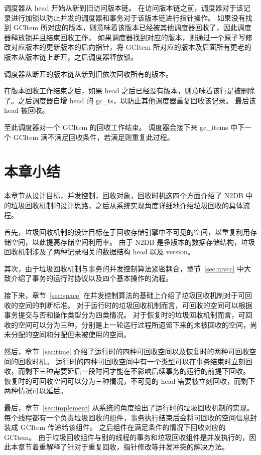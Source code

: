调度器从 head 开始从新到旧访问版本链。
在访问版本链之前，调度器对于该记录进行加锁以防止并发的调度器和事务对于该版本链进行指针操作。
如果没有找到 GCItem 所对应的版本，则意味着该版本已经被其他调度器回收了，因此调度器释放锁并且结束回收工作。
如果调度器找到对应的版本，则通过一个原子写修改对应版本的更新版本的后向指针，将 GCItem 所对应的版本及后面所有更老的版本从版本链上断开，之后调度器释放锁。

调度器从断开的版本链从新到旧依次回收所有的版本。

在版本回收工作结束之后，如果 head 之后已经没有版本，则意味着该行是被删除了。之后调度器自增 head 的 gc\_ts，以防止其他调度器重复回收该记录。
最后该 head 被回收。

至此调度器对一个 GCItem 的回收工作结束。
调度器会接下来 gc\_items 中下一个 GCItem 满不满足回收条件，若满足则重复此过程。


\section{本章小结}

本章节从设计目标，并发控制，回收对象，回收时机这四个方面介绍了 N2DB 中的垃圾回收机制的设计思路，之后从系统实现角度详细地介绍垃圾回收的具体流程。

首先，垃圾回收机制的设计目标在于回收存储引擎中不可见的空间，以重复利用存储空间，以此提高存储空间利用率。
由于 N2DB 是多版本的数据存储结构，垃圾回收机制涉及了两种记录相关的数据结构 head 以及 version。

其次，由于垃圾回收机制与事务的并发控制算法紧密耦合，章节~\ref{sec:mvcc} 中大致介绍了事务的运行时协议以及四个基本操作的流程。

接下来，章节~\ref{sec:space} 在并发控制算法的基础上介绍了垃圾回收机制对于可回收的空间的判断标准。
对于运行时的垃圾回收机制而言，可回收的空间可以根据事务提交与否和操作类型分为四类情况。
对于恢复时的垃圾回收机制而言，可回收的空间可以分为三种，分别是上一轮运行过程所遗留下来的未被回收的空间，尚未分配的空间和分配但未被使用的空间。

然后，章节~\ref{sec:time} 介绍了运行时的四种可回收空间以及恢复时的两种可回收空间的回收时机。
运行时的四种可回收空间中有一个类型可以在事务结束时立刻回收，而剩下三种需要延后一段时间才能在不影响后续事务的运行的前提下回收。
恢复时的可回收空间可以分为三种情况，不可见的 head 需要被立刻回收，而剩下两种情况可以延后。

最后，章节~\ref{sec:implement} 从系统的角度给出了运行时的垃圾回收机制的实现。每个线程都有一个负责垃圾回收的组件，事务执行结束后会将可回收的空间信息封装成 GCItem 传递给该组件。
之后组件在满足条件的情况下回收对应的 GCItem。
由于垃圾回收组件与别的线程的事务和垃圾回收组件是并发执行的，因此本章节着重解释了针对于重复回收，指针修改等并发冲突的解决方法。
